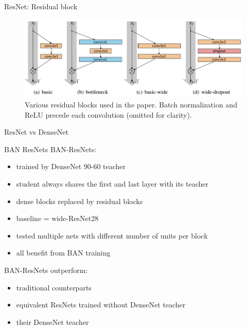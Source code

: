 \documentclass{beamer}
\begin{document}
\begin{frame}{ResNet: Residual block}
\begin{figure}[h]
\includegraphics[width=\textwidth]{img/resnet_blocks}
\caption{Various residual blocks used in the paper. Batch normalization and ReLU precede
each convolution (omitted for clarity). \cite{cit:resnet}}
\end{figure}
\end{frame}
\begin{frame}{ResNet vs DenseNet}

\end{frame}
\begin{frame}{BAN ResNets}
BAN-ResNets:
\begin{itemize}
\item trained by DenseNet 90-60 teacher
\item student always shares the first and last layer with its
teacher
\item dense blocks replaced by residual blocks
\item baseline = wide-ResNet28 \cite{cit:resnet}
\item tested multiple nets with different number of units per block
\item all benefit from BAN training

\end{itemize}

\vfill

BAN-ResNets outperform:
\begin{itemize}
\item traditional counterparts
\item equivalent ResNets trained without DenseNet teacher
\item their DenseNet teacher
\end{itemize}
\end{frame}
\end{document}

